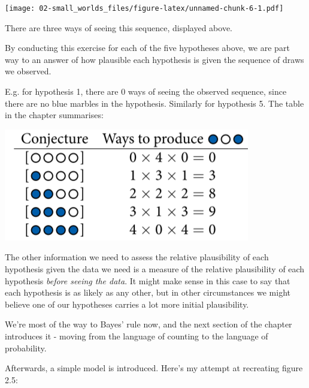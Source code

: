 \documentclass[
]{book}
\begin{document}
\texttt{[image: 02-small\_worlds\_files/figure-latex/unnamed-chunk-6-1.pdf]}

There are three ways of seeing this sequence, displayed above.

By conducting this exercise for each of the five hypotheses above, we are part way to an answer of how plausible each hypothesis is given the sequence of draws we observed.

E.g. for hypothesis 1, there are 0 ways of seeing the observed sequence, since there are no blue marbles in the hypothesis. Similarly for hypothesis 5. The table in the chapter summarises:

\includegraphics{images/Ch02Img01.png}

The other information we need to assess the relative plausibility of each hypothesis given the data we need is a measure of the relative plausibility of each hypothesis \emph{before seeing the data}. It might make sense in this case to say that each hypothesis is as likely as any other, but in other circumstances we might believe one of our hypotheses carries a lot more initial plausibility.

We're most of the way to Bayes' rule now, and the next section of the chapter introduces it - moving from the language of counting to the language of probability.

Afterwards, a simple model is introduced. Here's my attempt at recreating figure 2.5:
\end{document}
